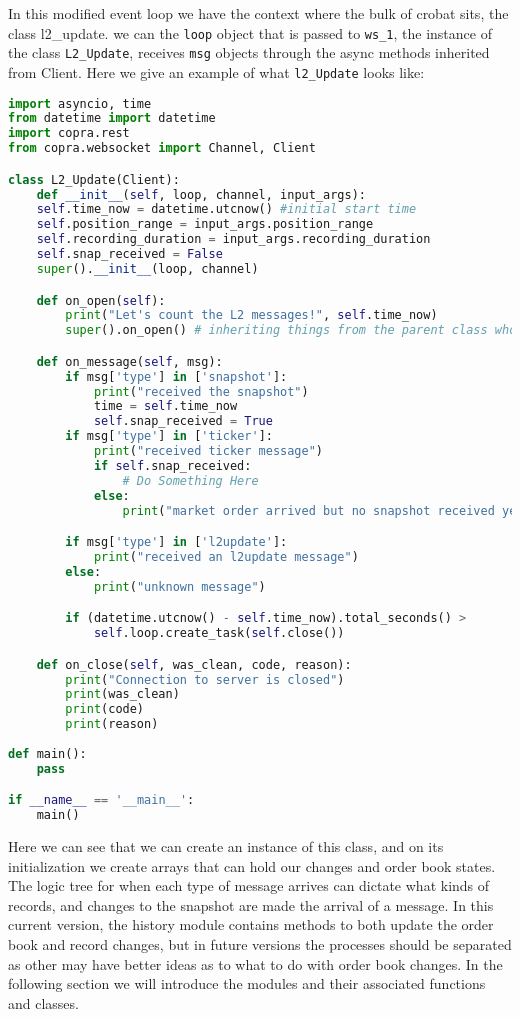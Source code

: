 In this modified event loop we have the context where the bulk of crobat sits, the class l2\_update. we can the \texttt{loop} object that is passed to \texttt{ws\_1}, the instance of the class \texttt{L2\_Update}, receives \texttt{msg} objects through the async methods inherited from Client. Here we give an example of what \texttt{l2\_Update} looks like:\newpage

\begin{lstlisting}[language=Python]
import asyncio, time
from datetime import datetime
import copra.rest
from copra.websocket import Channel, Client

class L2_Update(Client):
	def __init__(self, loop, channel, input_args):
	self.time_now = datetime.utcnow() #initial start time
	self.position_range = input_args.position_range
	self.recording_duration = input_args.recording_duration
	self.snap_received = False
	super().__init__(loop, channel)

	def on_open(self):
		print("Let's count the L2 messages!", self.time_now)
		super().on_open() # inheriting things from the parent class who really knows    

	def on_message(self, msg):
		if msg['type'] in ['snapshot']:
			print("received the snapshot")
			time = self.time_now
			self.snap_received = True
		if msg['type'] in ['ticker']:
			print("received ticker message")
			if self.snap_received:
				# Do Something Here
			else:
				print("market order arrived but no snapshot received yet")

		if msg['type'] in ['l2update']:
			print("received an l2update message")
		else:
			print("unknown message")

		if (datetime.utcnow() - self.time_now).total_seconds() > 		self.recording_duration:
			self.loop.create_task(self.close()) 

	def on_close(self, was_clean, code, reason):
		print("Connection to server is closed")
		print(was_clean)
		print(code)
		print(reason)
		
def main():
	pass

if __name__ == '__main__':
	main()
\end{lstlisting}

Here we can see that we can create an instance of this class, and on its initialization we create arrays that can hold our changes and order book states. The logic tree for when each type of message arrives can dictate what kinds of records, and changes to the snapshot are made the arrival of a message. In this current version, the history module contains methods to both update the order book and record changes, but in future versions the processes should be separated as other may have better ideas as to what to do with order book changes. In the following section we will introduce the modules and their associated functions and classes.